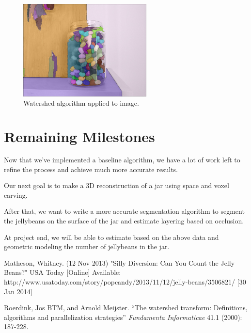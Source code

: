 \documentclass{article}
\begin{document}
\begin{figure}[h]
\centering
\includegraphics[width=0.6\textwidth]{../wshed.jpg}
\caption{Watershed algorithm applied to image.}
\end{figure}

\section*{Remaining Milestones}

Now that we've implemented a baseline algorithm, we have a lot of work left to refine the process and achieve much more accurate results.

Our next goal is to make a 3D reconstruction of a jar using space and voxel carving.

After that, we want to write a more accurate segmentation algorithm to segment the jellybeans on the surface of the jar and estimate layering based on occlusion.

At project end, we will be able to estimate based on the above data and geometric modeling the number of jellybeans in the jar. 

\begin{thebibliography}{9}

	Matheson, Whitney. (12 Nov 2013) "Silly Diversion: Can You Count the Jelly Beans?" USA Today 		[Online] Available: http://www.usatoday.com/story/popcandy/2013/11/12/jelly-beans/3506821/ [30 Jan 2014]
	
Roerdink, Jos BTM, and Arnold Meijster. ``The watershed transform: Definitions, algorithms and parallelization strategies'' \emph{Fundamenta Informaticae} 41.1 (2000): 187-228.

\end{thebibliography}
\end{document}
